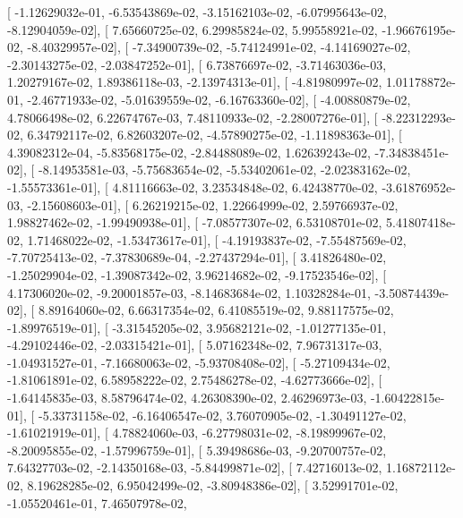 \documentclass{article}
\begin{document}
       [ -1.12629032e-01,  -6.53543869e-02,  -3.15162103e-02,
         -6.07995643e-02,  -8.12904059e-02],
       [  7.65660725e-02,   6.29985824e-02,   5.99558921e-02,
         -1.96676195e-02,  -8.40329957e-02],
       [ -7.34900739e-02,  -5.74124991e-02,  -4.14169027e-02,
         -2.30143275e-02,  -2.03847252e-01],
       [  6.73876697e-02,  -3.71463036e-03,   1.20279167e-02,
          1.89386118e-03,  -2.13974313e-01],
       [ -4.81980997e-02,   1.01178872e-01,  -2.46771933e-02,
         -5.01639559e-02,  -6.16763360e-02],
       [ -4.00880879e-02,   4.78066498e-02,   6.22674767e-03,
          7.48110933e-02,  -2.28007276e-01],
       [ -8.22312293e-02,   6.34792117e-02,   6.82603207e-02,
         -4.57890275e-02,  -1.11898363e-01],
       [  4.39082312e-04,  -5.83568175e-02,  -2.84488089e-02,
          1.62639243e-02,  -7.34838451e-02],
       [ -8.14953581e-03,  -5.75683654e-02,  -5.53402061e-02,
         -2.02383162e-02,  -1.55573361e-01],
       [  4.81116663e-02,   3.23534848e-02,   6.42438770e-02,
         -3.61876952e-03,  -2.15608603e-01],
       [  6.26219215e-02,   1.22664999e-02,   2.59766937e-02,
          1.98827462e-02,  -1.99490938e-01],
       [ -7.08577307e-02,   6.53108701e-02,   5.41807418e-02,
          1.71468022e-02,  -1.53473617e-01],
       [ -4.19193837e-02,  -7.55487569e-02,  -7.70725413e-02,
         -7.37830689e-04,  -2.27437294e-01],
       [  3.41826480e-02,  -1.25029904e-02,  -1.39087342e-02,
          3.96214682e-02,  -9.17523546e-02],
       [  4.17306020e-02,  -9.20001857e-03,  -8.14683684e-02,
          1.10328284e-01,  -3.50874439e-02],
       [  8.89164060e-02,   6.66317354e-02,   6.41085519e-02,
          9.88117575e-02,  -1.89976519e-01],
       [ -3.31545205e-02,   3.95682121e-02,  -1.01277135e-01,
         -4.29102446e-02,  -2.03315421e-01],
       [  5.07162348e-02,   7.96731317e-03,  -1.04931527e-01,
         -7.16680063e-02,  -5.93708408e-02],
       [ -5.27109434e-02,  -1.81061891e-02,   6.58958222e-02,
          2.75486278e-02,  -4.62773666e-02],
       [ -1.64145835e-03,   8.58796474e-02,   4.26308390e-02,
          2.46296973e-03,  -1.60422815e-01],
       [ -5.33731158e-02,  -6.16406547e-02,   3.76070905e-02,
         -1.30491127e-02,  -1.61021919e-01],
       [  4.78824060e-03,  -6.27798031e-02,  -8.19899967e-02,
         -8.20095855e-02,  -1.57996759e-01],
       [  5.39498686e-03,  -9.20700757e-02,   7.64327703e-02,
         -2.14350168e-03,  -5.84499871e-02],
       [  7.42716013e-02,   1.16872112e-02,   8.19628285e-02,
          6.95042499e-02,  -3.80948386e-02],
       [  3.52991701e-02,  -1.05520461e-01,   7.46507978e-02,
\end{document}
